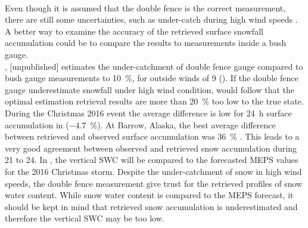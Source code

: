 \\
Even though it is assumed that the double fence is the correct measurement, there are still some uncertainties, such as under-catch during high wind speeds \citep[][unpublished]{wolff_wmo_2018}. 
A better way to examine the accuracy of the retrieved surface snowfall accumulation could be to compare the results to measurements inside a bush gauge. 
\\
\citet{wolff_wmo_2018}, [unpublished] estimates the under-catchment of double fence gauge compared to bush gauge measurements to \SI{10}{\percent}, for outside winds of \SI{9}{\mPs} ().
If the double fence gauge underestimate snowfall under high wind condition, would follow that the optimal estimation retrieval results are more than \SI{20}{\percent} too low to the true state. 
\\
During the Christmas 2016 event the average difference is low for \SI{24}{\hour} surface accumulation in  (\SI{-4.7}{\percent}). At Barrow, Alaska, the best average difference between retrieved and observed surface accumulation was \SI{36}{\percent} \citep{cooper_variational_2017}.
This leads to a very good agreement between observed and retrieved snow accumulation during \num{21} to \SI{24}{\dec}. 
In , the vertical SWC will be compared to the forecasted MEPS values for the 2016 Christmas storm. Despite the under-catchment of snow in high wind speeds, the double fence measurement give trust for the retrieved profiles of snow water content. While snow water content is compared to the MEPS forecast, it should be kept in mind that retrieved snow accumulation is underestimated and therefore the vertical SWC may be too low.











